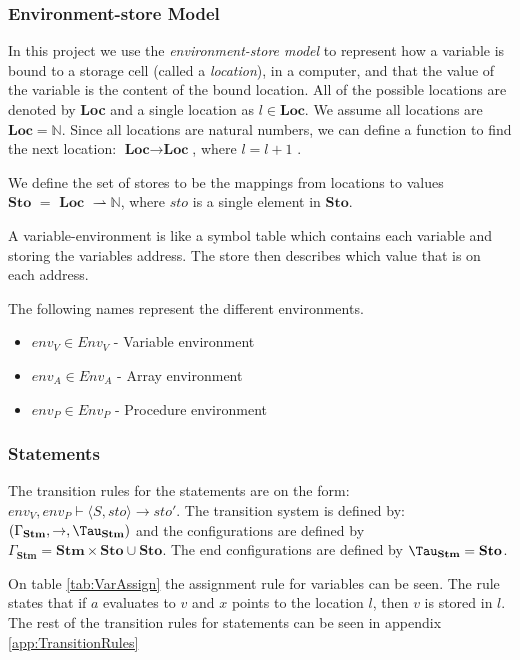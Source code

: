 \subsubsection{Environment-store Model}
In this project we use the \textit{environment-store model} to represent how a variable is bound to a storage cell (called a \textit{location}), in a computer, and that the value of the variable is the content of the bound location. All of the possible locations are denoted by \textbf{Loc} and a single location as $l \in \textbf{Loc}$. We assume all locations are $\textbf{Loc} = \mathbb{N}$. Since all locations are natural numbers, we can define a function to find the next location: $\textbf{Loc} \rightarrow \textbf{Loc}$, where $l = l + 1$ \citep{HHTree}. 

We define the set of stores to be the mappings from locations to values $\textbf{Sto } = \textbf{ Loc } \rightharpoonup \mathbb{N}$, where $sto$ is a single element in $\textbf{Sto}$.

A variable-environment is like a symbol table which contains each variable and storing the variables address. The store then describes which value that is on each address.

The following names represent the different environments. 
\begin{itemize}
\item $env_V \in Env_V$ - Variable environment
\item $env_A \in Env_A$ - Array environment
\item $env_P \in Env_P$ - Procedure environment
\end{itemize}

\subsubsection{Statements}
The transition rules for the statements are on the form: $env_V, env_P \vdash \langle S, sto \rangle \rightarrow sto'$. The transition system is defined by: $(\Gamma_{\mathbf{Stm}}, \rightarrow, \Tau_{\mathbf{Stm}})$ and the configurations are defined by $\Gamma_{\mathbf{Stm}} = \textbf{Stm} \times \textbf{Sto} \cup \textbf{Sto}$. The end configurations are defined by $\Tau_{\mathbf{Stm}} = \textbf{Sto}$.

On table \ref{tab:VarAssign} the assignment rule for variables can be seen. The rule states that if $a$ evaluates to $v$ and $x$ points to the location $l$, then $v$ is stored in $l$. The rest of the transition rules for statements can be seen in appendix \ref{app:TransitionRules}


